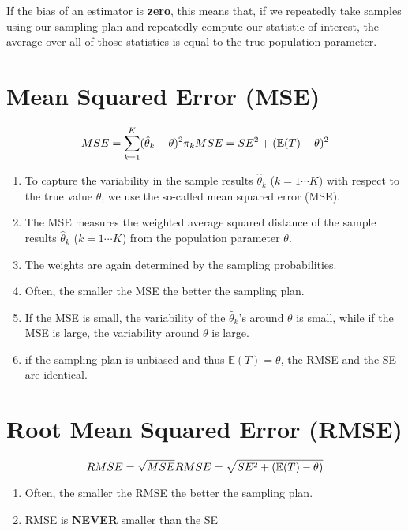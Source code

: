 If the bias of an estimator is \textbf{zero}, this means that, if we repeatedly take samples using our sampling plan and repeatedly compute our statistic of interest, the average over all of those statistics is equal to the true population parameter.

\section{Mean Squared Error (MSE) \cite{ism-1}}
\[
    \hfill
    MSE = \dsum_{k=1}^{K}
    (\hat{\theta}_k - \theta)^2 \pi_k
    \hfill
    MSE = SE^2 + (\mathbb{E}(T) - \theta)^2
    \hfill
\]

\begin{enumerate}
    \item To capture the variability in the sample results  $\hat{\theta}_k$ ($k = 1\cdots K$) with respect to the true value $\theta$, we use the so-called mean squared error (MSE).

    \item The MSE measures the weighted average squared distance of the sample results $\hat{\theta}_k$ ($k = 1\cdots K$) from the population parameter $\theta$.

    \item The weights are again determined by the sampling probabilities. 

    \item Often, the smaller the MSE the better the sampling plan.

    \item If the MSE is small, the variability of the $\hat{\theta}_k$’s around $\theta$ is small, while if the MSE is large, the variability around $\theta$ is large.

    \item if the sampling plan is unbiased and thus $\mathbb{E}(T) = \theta$, the RMSE and the SE are identical.

\end{enumerate}


\section{Root Mean Squared Error (RMSE) \cite{ism-1}}
\[
    \hfill
    RMSE = \sqrt{MSE}
    \hfill
    RMSE = \sqrt{SE^2 + (\mathbb{E}(T) - \theta)}
    \hfill
\]

\begin{enumerate}
    \item Often, the smaller the RMSE the better the sampling plan.

    \item RMSE is \textbf{NEVER} smaller than the SE
\end{enumerate}


